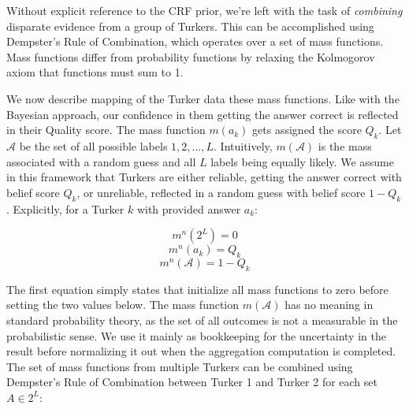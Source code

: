 Without explicit reference to the CRF prior, we're left with the task of \textit{combining} disparate evidence from a group of Turkers.  This can be accomplished using Dempster's Rule of Combination, which operates over a set of mass functions.  Mass functions differ from probability functions by relaxing the Kolmogorov axiom that functions must sum to 1.



We now describe mapping of the Turker data these mass functions.  Like with the Bayesian approach, our confidence in them getting the answer correct is reflected in their Quality score.  The mass function $m(a_{k})$ gets assigned the score $Q_{k}$.  Let $\mathcal{A}$ be the set of all possible labels ${1,2,...,L}$.  Intuitively, $m(\mathcal{A})$ is the mass associated with a random guess and all $L$ labels being equally likely.  We assume in this framework that Turkers are either reliable, getting the answer correct with belief score $Q_{k}$, or unreliable, reflected in a random guess with belief score $1-Q_{k}$.  Explicitly, for a Turker $k$ with provided answer $a_{k}$:

\begin{equation}
m^{n}(2^{L}) = 0
\end{equation}
\begin{equation}
m^{n}(a_{k}) = Q_{k}
\end{equation}
\begin{equation}
m^{n}(\mathcal{A}) = 1-Q_{k}
\end{equation}

The first equation simply states that initialize all mass functions to zero before setting the two values below.  The mass function $m(\mathcal{A})$ has no meaning in standard probability theory, as the set of all outcomes is not a measurable in the probabilistic sense.  We use it mainly as bookkeeping for the uncertainty in the result before normalizing it out when the aggregation computation is completed.  The set of mass functions from multiple Turkers can be combined using Dempster's Rule of Combination between Turker 1 and Turker 2 for each set $A\in2^{L}$:

